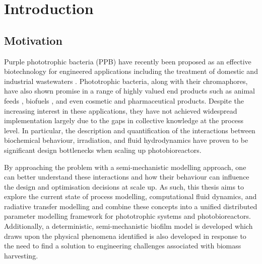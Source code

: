 \chapter[Introduction]{Introduction}
\label{chap:chap1}
\section{Motivation}
\label{sec:chap1-motivation}
Purple phototrophic bacteria (PPB) have recently been proposed as an effective biotechnology for engineered applications including the treatment of domestic \cite{Hulsen2016} and industrial wastewaters \cite{Hulsen2018}. Phototrophic bacteria, along with their chromaphores, have also shown promise in a range of highly valued end products such as animal feeds \cite{Sun2016}, biofuels \cite{Adessi2014}, and even cosmetic and pharmaceutical products\cite{Liu2013, Wang2018}. Despite the increasing interest in these applications, they have not achieved widespread implementation largely due to the gaps in collective knowledge at the process level. In particular, the description and quantification of the interactions between biochemical behaviour, irradiation, and fluid hydrodynamics have proven to be significant design bottlenecks when scaling up photobioreactors. 

By approaching the problem with a semi-mechanistic modelling approach, one can better understand these interactions and how their behaviour can influence the design and optimisation decisions at scale up. As such, this thesis aims to explore the current state of process modelling, computational fluid dynamics, and radiative transfer modelling and combine these concepts into a unified distributed parameter modelling framework for phototrophic systems and photobioreactors.  Additionally, a deterministic, semi-mechanistic biofilm model is developed which draws upon the physical phenomena identified is also developed in response to the need to find a solution to engineering challenges associated with biomass harvesting. 





\newpage
